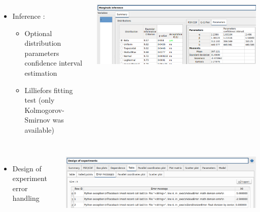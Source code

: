 \documentclass[aspectratio=169]{beamer}
\begin{document}

\begin{frame}
  \begin{columns}
    \begin{itemize}
    \item Inference :
      \begin{itemize}
      \item Optional distribution parameters confidence interval estimation
      \item Lilliefors fitting test (only Kolmogorov-Smirnov was available)
      \end{itemize}
    \end{itemize}
    \begin{center}
      \includegraphics[height=0.3\textheight]{figures/inference.png}
    \end{center}
  \end{columns}

  \begin{columns}
    \begin{itemize}
    \item Design of experiment error handling
    \end{itemize}
    \begin{center}
      \includegraphics[height=0.3\textheight]{figures/errorDesc.png}
    \end{center}
  \end{columns}
\end{frame}

\end{document}
